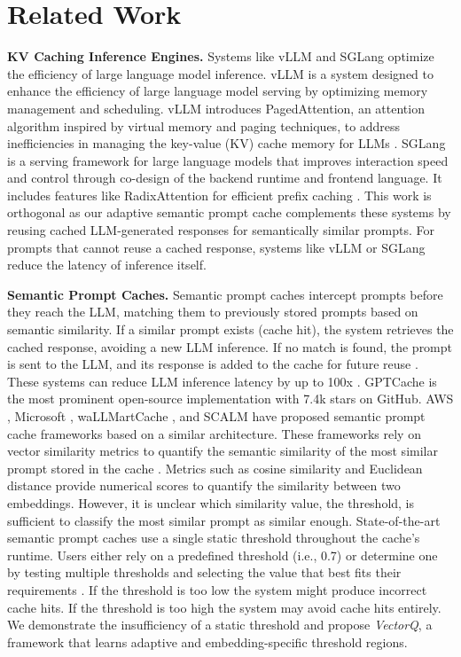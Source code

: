 \section{Related Work}
\label{related-work}

\textbf{KV Caching Inference Engines.} Systems like vLLM \cite{kwon2023efficient} and SGLang \cite{zheng2023efficiently} optimize  the efficiency of large language model inference. vLLM is a system designed to enhance the efficiency of large language model serving by optimizing memory management and scheduling. vLLM introduces PagedAttention, an attention algorithm inspired by virtual memory and paging techniques, to address inefficiencies in managing the key-value (KV) cache memory for LLMs \cite{kwon2023efficient}. SGLang is a serving framework for large language models that improves interaction speed and control through co-design of the backend runtime and frontend language. It includes features like RadixAttention for efficient prefix caching \cite{zheng2023efficiently}. This work is orthogonal as our adaptive semantic prompt cache complements these systems by reusing cached LLM-generated responses for semantically similar prompts. For prompts that cannot reuse a cached response, systems like vLLM or SGLang reduce the latency of inference itself.

\textbf{Semantic Prompt Caches.} Semantic prompt caches intercept prompts before they reach the LLM, matching them to previously stored prompts based on semantic similarity. If a similar prompt exists (cache hit), the system retrieves the cached response, avoiding a new LLM inference. If no match is found, the prompt is sent to the LLM, and its response is added to the cache for future reuse \cite{bang2023gptcache}. These systems can reduce LLM inference latency by up to 100x \cite{gptcache}. GPTCache \cite{gptcache} is the most prominent open-source implementation with 7.4k stars on GitHub. AWS \cite{aws}, Microsoft \cite{microsoft}, waLLMartCache \cite{dasgupta2025wallmartcache}, and SCALM \cite{li2024scalm} have proposed semantic prompt cache frameworks based on a similar architecture. These frameworks rely on vector similarity metrics to quantify the semantic similarity of the most similar prompt stored in the cache \cite{bang2023gptcache}. Metrics such as cosine similarity \cite{rahutomo2012semantic} and Euclidean distance \cite{globerson2004euclidean} provide numerical scores to quantify the similarity between two embeddings. However, it is unclear which similarity value, the threshold, is sufficient to classify the most similar prompt as similar enough. State-of-the-art semantic prompt caches use a single static threshold throughout the cache's runtime. Users either rely on a predefined threshold (i.e., 0.7) or determine one by testing multiple thresholds and selecting the value that best fits their requirements \cite{dasgupta2025wallmartcache}. If the threshold is too low the system might produce incorrect cache hits. If the threshold is too high the system may avoid cache hits entirely. We demonstrate the insufficiency of a static threshold and propose \textit{VectorQ}, a framework that learns adaptive and embedding-specific threshold regions.
